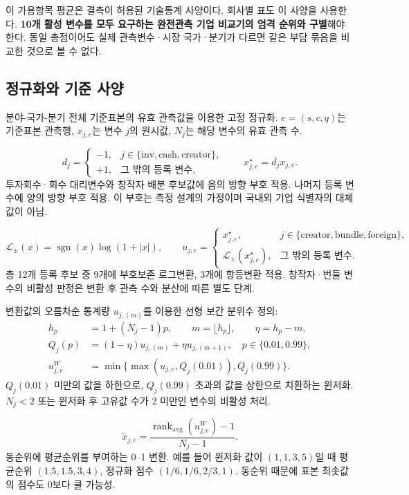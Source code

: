 \documentclass[11pt,a4paper]{report}
\begin{document}
이 가용항목 평균은 결측이 허용된 기술통계 사양이다. 회사별 표도 이 사양을 사용한다. \textbf{10개 활성 변수를 모두 요구하는 완전관측 기업 비교기의 엄격 순위와 구별}해야 한다. 동일 총점이어도 실제 관측변수·시장 국가·분기가 다르면 같은 부담 묶음을 비교한 것으로 볼 수 없다.

\subsection{정규화와 기준 사양}
분야-국가-분기 전체 기준표본의 유효 관측값을 이용한 고정 정규화. \(e=(s,c,q)\)는 기준표본 관측행, \(x_{j,e}\)는 변수 \(j\)의 원시값, \(N_j\)는 해당 변수의 유효 관측 수.

\[
d_j=
\begin{cases}
-1,&j\in\{\mathrm{inv},\mathrm{cash},\mathrm{creator}\},\\
+1,&\text{그 밖의 등록 변수},
\end{cases}
\qquad x^\star_{j,e}=d_jx_{j,e}.
\]
투자회수·회수 대리변수와 창작자 배분 후보값에 음의 방향 부호 적용. 나머지 등록 변수에 양의 방향 부호 적용. 이 부호는 측정 설계의 가정이며 국내외 기업 식별자의 대체값이 아님.

\[
\mathcal L_\pm(x)=\operatorname{sgn}(x)\log(1+|x|),
\qquad
u_{j,e}=
\begin{cases}
x^\star_{j,e},&j\in\{\mathrm{creator},\mathrm{bundle},\mathrm{foreign}\},\\
\mathcal L_\pm(x^\star_{j,e}),&\text{그 밖의 등록 변수}.
\end{cases}
\]
총 12개 등록 후보 중 9개에 부호보존 로그변환, 3개에 항등변환 적용. 창작자·번들 변수의 비활성 판정은 변환 후 관측 수와 분산에 따른 별도 단계.

변환값의 오름차순 통계량 \(u_{j,(m)}\)를 이용한 선형 보간 분위수 정의:
\[
\begin{aligned}
h_p&=1+(N_j-1)p,\qquad m=\lfloor h_p\rfloor,\qquad \eta=h_p-m,\\
Q_j(p)&=(1-\eta)u_{j,(m)}+\eta u_{j,(m+1)},\quad p\in\{0.01,0.99\},\\
u^W_{j,e}&=\min\{\max(u_{j,e},Q_j(0.01)),Q_j(0.99)\}.
\end{aligned}
\]
\(Q_j(0.01)\) 미만의 값을 하한으로, \(Q_j(0.99)\) 초과의 값을 상한으로 치환하는 윈저화. \(N_j<2\) 또는 윈저화 후 고유값 수가 2 미만인 변수의 비활성 처리.

\[
\tilde x_{j,e}=\frac{\operatorname{rank}_{\mathrm{avg}}(u^W_{j,e})-1}{N_j-1}.
\]
동순위에 평균순위를 부여하는 0--1 변환. 예를 들어 윈저화 값이 \((1,1,3,5)\)일 때 평균순위 \((1.5,1.5,3,4)\), 정규화 점수 \((1/6,1/6,2/3,1)\). 동순위 때문에 표본 최솟값의 점수도 0보다 클 가능성.
\end{document}

